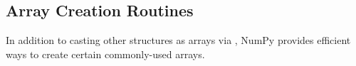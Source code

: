 \begin{comment}
We specify the data type of an array as it is created with the keyword argument \li{dtype}.
If unspecified, then the type is determined as the minimum type required to hold the objects in the provided sequence.
To change an existing array's type, use the array's \li{astype()} method.

\begin{lstlisting}
# A list of integers becomes an array of integers.
>>> x = np.array([0, 1, 2, 3, 4])
>>> print(x)
[0 1 2 3 4]
>>> x.dtype
<<dtype('int64')>>

# Change the data type to one of NumPy's float types.
>>> x = x.astype(np.float64)
>>> print(x)
[ 0.  1.  2.  3.  4.]
>>> x.dtype
<<dtype('float64')>>
\end{lstlisting}

\begin{warn}
The default data type for most NumPy operations is \li{np.float64}.
Using smaller data types can speed up computations, but can result in unexpected problems due to overflow.

For example, an integer represented in binary with 8 bits (including one bit for the sign) can range from $-128$ to $127$.
Casting a number outside of this range as an 8-bit integer can cause some unexpected overflow issues.

\begin{lstlisting}
>>> np.int8(200)
-56
\end{lstlisting}
\end{warn}
\end{comment}

\subsection*{Array Creation Routines} %

In addition to casting other structures as arrays via , NumPy provides efficient ways to create certain commonly-used arrays.

